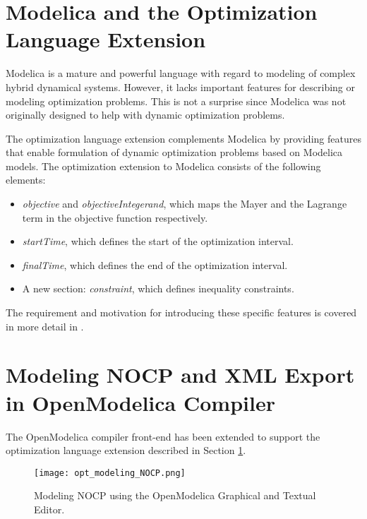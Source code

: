 \section{Modelica and the Optimization Language Extension}
\label{sec:optimizationoptimica}

Modelica is a mature and powerful language with regard to modeling of complex hybrid dynamical systems. However, it
lacks important features for describing or modeling optimization problems. This is not a surprise since Modelica
was not originally designed to help with dynamic optimization problems.

The optimization language extension \cite{optimica} complements Modelica by providing features that enable
formulation of dynamic optimization problems based on Modelica models. The optimization extension to Modelica
consists of the following elements:

\begin{itemize}
	
\item \textit{objective} and \textit{objectiveIntegerand}, which maps the Mayer and the Lagrange term in 
            the objective function respectively.
\item \textit{startTime}, which defines the start of the optimization interval.
\item \textit{finalTime}, which defines the end of the optimization interval.
\item A new section: \textit{constraint}, which defines inequality constraints.
\end{itemize}

The requirement and motivation for introducing these specific features is covered in more detail in \cite{optimica}.

\section{Modeling NOCP and XML Export in OpenModelica Compiler}
\label{sec:optimizationopenmodelica}

The OpenModelica compiler front-end has been extended to support the optimization language extension described in
Section \ref{sec:optimizationoptimica}. 

\begin{figure} [!h]
	\texttt{[image: opt\_modeling\_NOCP.png]}
	\caption{Modeling NOCP using the OpenModelica Graphical and Textual Editor.}
	\label{fig:nocpmodel}
\end{figure}

